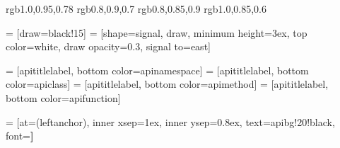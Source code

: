 
%
%
\definecolor{apinamespace} {rgb}{1.0,0.95,0.78}
\definecolor{apimethod}    {rgb}{0.8,0.9,0.7}
\definecolor{apiclass}     {rgb}{0.8,0.85,0.9}
\definecolor{apifunction}  {rgb}{1.0,0.85,0.6}

%
%
    = [draw=black!15]
 = [shape=signal, draw,
                             minimum height=3ex, top color=white,
                             draw opacity=0.3,
                             signal to=east]

 = [apititlelabel, bottom color=apinamespace]
     = [apititlelabel, bottom color=apiclass]
    = [apititlelabel, bottom color=apimethod]
  = [apititlelabel, bottom color=apifunction]

 = [at=(leftanchor), inner xsep=1ex, inner ysep=0.8ex,
                               text=apibg!20!black, font=\bfseries \small]


